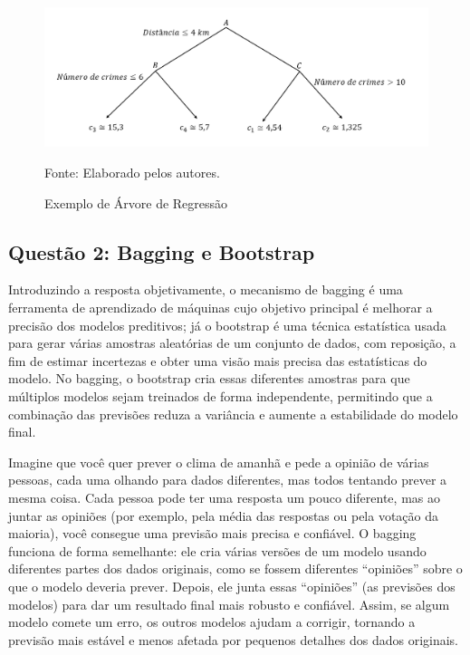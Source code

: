 \documentclass[a4paper,12pt]{article}[abntex2]
\begin{document}
\begin{figure}[H]
    \centering
    \caption{Exemplo de Árvore de Regressão} 
    \includegraphics[width=1.0\textwidth]{APS/fig3 - 1.png}
    \label{fig3 - 1}
    
    \footnotesize{Fonte: Elaborado pelos autores.}
\end{figure}

\newpage
\subsection*{Questão 2: Bagging e Bootstrap}

Introduzindo a resposta objetivamente, o mecanismo de bagging é uma ferramenta de aprendizado de máquinas cujo objetivo principal é melhorar a precisão dos modelos preditivos; já o bootstrap é uma técnica estatística usada para gerar várias amostras aleatórias de um conjunto de dados, com reposição, a fim de estimar incertezas e obter uma visão mais precisa das estatísticas do modelo. No bagging, o bootstrap cria essas diferentes amostras para que múltiplos modelos sejam treinados de forma independente, permitindo que a combinação das previsões reduza a variância e aumente a estabilidade do modelo final.

Imagine que você quer prever o clima de amanhã e pede a opinião de várias pessoas, cada uma olhando para dados diferentes, mas todos tentando prever a mesma coisa. Cada pessoa pode ter uma resposta um pouco diferente, mas ao juntar as opiniões (por exemplo, pela média das respostas ou pela votação da maioria), você consegue uma previsão mais precisa e confiável. O bagging funciona de forma semelhante: ele cria várias versões de um modelo usando diferentes partes dos dados originais, como se fossem diferentes “opiniões” sobre o que o modelo deveria prever. Depois, ele junta essas “opiniões” (as previsões dos modelos) para dar um resultado final mais robusto e confiável. Assim, se algum modelo comete um erro, os outros modelos ajudam a corrigir, tornando a previsão mais estável e menos afetada por pequenos detalhes dos dados originais.
\end{document}
